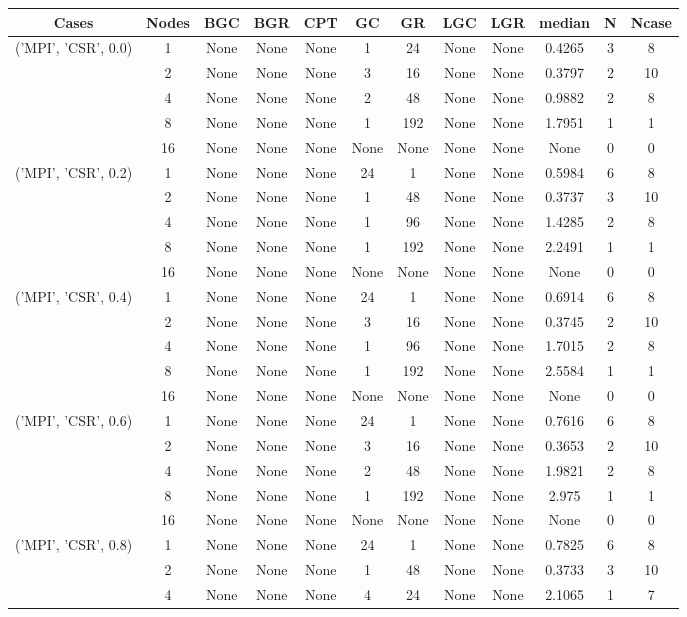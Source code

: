 \begin{tabular}{cccccccccccc}
\hline
Cases & Nodes& BGC& BGR& CPT& GC& GR& LGC& LGR& median & N & Ncase \\
\hline
\multirow{5}{*}{('MPI', 'CSR', 0.0)}& 1& None& None& None& 1& 24& None& None& 0.4265& 3& 8\\
& 2& None& None& None& 3& 16& None& None& 0.3797& 2& 10\\
& 4& None& None& None& 2& 48& None& None& 0.9882& 2& 8\\
& 8& None& None& None& 1& 192& None& None& 1.7951& 1& 1\\
& 16& None& None& None& None& None& None& None& None& 0& 0\\
\hline
\multirow{5}{*}{('MPI', 'CSR', 0.2)}& 1& None& None& None& 24& 1& None& None& 0.5984& 6& 8\\
& 2& None& None& None& 1& 48& None& None& 0.3737& 3& 10\\
& 4& None& None& None& 1& 96& None& None& 1.4285& 2& 8\\
& 8& None& None& None& 1& 192& None& None& 2.2491& 1& 1\\
& 16& None& None& None& None& None& None& None& None& 0& 0\\
\hline
\multirow{5}{*}{('MPI', 'CSR', 0.4)}& 1& None& None& None& 24& 1& None& None& 0.6914& 6& 8\\
& 2& None& None& None& 3& 16& None& None& 0.3745& 2& 10\\
& 4& None& None& None& 1& 96& None& None& 1.7015& 2& 8\\
& 8& None& None& None& 1& 192& None& None& 2.5584& 1& 1\\
& 16& None& None& None& None& None& None& None& None& 0& 0\\
\hline
\multirow{5}{*}{('MPI', 'CSR', 0.6)}& 1& None& None& None& 24& 1& None& None& 0.7616& 6& 8\\
& 2& None& None& None& 3& 16& None& None& 0.3653& 2& 10\\
& 4& None& None& None& 2& 48& None& None& 1.9821& 2& 8\\
& 8& None& None& None& 1& 192& None& None& 2.975& 1& 1\\
& 16& None& None& None& None& None& None& None& None& 0& 0\\
\hline
\multirow{5}{*}{('MPI', 'CSR', 0.8)}& 1& None& None& None& 24& 1& None& None& 0.7825& 6& 8\\
& 2& None& None& None& 1& 48& None& None& 0.3733& 3& 10\\
& 4& None& None& None& 4& 24& None& None& 2.1065& 1& 7\\

\end{tabular}

